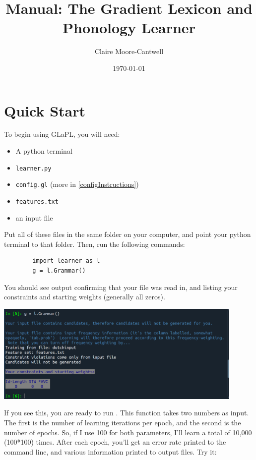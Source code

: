 \documentclass[12]{article}
\title{Manual: The Gradient Lexicon and Phonology Learner}
\author{Claire Moore-Cantwell}
\date{\today}
\begin{document}
\maketitle

\section{Quick Start}

To begin using GLaPL, you will need:
\begin{itemize}
\item A python terminal
\item \texttt{learner.py}
\item \texttt{config.gl} (more in \ref{configInstructions})
\item \texttt{features.txt}
\item an input file
\end{itemize}

Put all of these files in the same folder on your computer, and point your python terminal to that folder.  Then, run the following commands:

	\begin{verbatim}
		import learner as l
		g = l.Grammar()
	\end{verbatim}

You should see output confirming that your file was read in, and listing your constraints and starting weights (generally all zeros).  

\includegraphics[width=0.9\textwidth]{embeddedImages/grammarCreationOutput.pdf}

If you see this, you are ready to run .  This function takes two numbers as input.  The first is the number of learning iterations per epoch, and the second is the number of epochs.  So, if I use 100 for both parameters, I'll learn a total of 10,000 (100*100) times.  After each epoch, you'll get an error rate printed to the command line, and various information printed to output files.  Try it:
\end{document}
